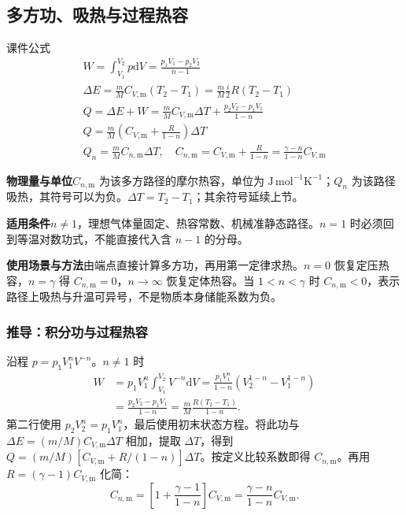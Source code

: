 \documentclass[UTF8,fontset=none,zihao=-4,a4paper]{ctexart}
\newcommand{\explain}[3]{\par\noindent\textbf{物理量与单位}\quad #1\par
\noindent\textbf{适用条件}\quad #2\par
\noindent\textbf{使用场景与方法}\quad #3\par}
\begin{document}
\par\noindent\begin{minipage}{\linewidth}
\subsection{多方功、吸热与过程热容}
\begin{infobox}[breakable=false]{课件公式}
\begin{gather*}W=\int_{V_1}^{V_2}p\mathrm dV=\frac{p_1V_1-p_2V_2}{n-1}\\\Delta E=\frac mM C_{V,\mathrm m}(T_2-T_1)=\frac mM\frac i2R(T_2-T_1)\\Q=\Delta E+W=\frac mM C_{V,\mathrm m}\Delta T+\frac{p_2V_2-p_1V_1}{1-n}\\Q=\frac mM\left(C_{V,\mathrm m}+\frac R{1-n}\right)\Delta T\\Q_n=\frac mM C_{n,\mathrm m}\Delta T,\quad C_{n,\mathrm m}=C_{V,\mathrm m}+\frac R{1-n}=\frac{\gamma-n}{1-n}C_{V,\mathrm m}\end{gather*}
\end{infobox}
\end{minipage}\par
\explain{$C_{n,\mathrm m}$ 为该多方路径的摩尔热容，单位为 $\mathrm{J\,mol^{-1}K^{-1}}$；$Q_n$ 为该路径吸热，其符号可以为负。$\Delta T=T_2-T_1$；其余符号延续上节。}{$n\ne1$，理想气体量固定、热容常数、机械准静态路径。$n=1$ 时必须回到等温对数功式，不能直接代入含 $n-1$ 的分母。}{由端点直接计算多方功，再用第一定律求热。$n=0$ 恢复定压热容，$n=\gamma$ 得 $C_{n,\mathrm m}=0$，$n\to\infty$ 恢复定体热容。当 $1<n<\gamma$ 时 $C_{n,\mathrm m}<0$，表示路径上吸热与升温可异号，不是物质本身储能系数为负。}


\subsubsection{推导：积分功与过程热容}
沿程 $p=p_1V_1^nV^{-n}$。$n\ne1$ 时
\begin{align*}
W&=p_1V_1^n\int_{V_1}^{V_2}V^{-n}\mathrm dV
=\frac{p_1V_1^n}{1-n}(V_2^{1-n}-V_1^{1-n})\\
&=\frac{p_2V_2-p_1V_1}{1-n}
=\frac{m}{M}\frac{R(T_2-T_1)}{1-n}.
\end{align*}
第二行使用 $p_2V_2^n=p_1V_1^n$，最后使用初末状态方程。将此功与 $\Delta E=(m/M)C_{V,\mathrm m}\Delta T$ 相加，提取 $\Delta T$，得到 $Q=(m/M)[C_{V,\mathrm m}+R/(1-n)]\Delta T$。按定义比较系数即得 $C_{n,\mathrm m}$。再用 $R=(\gamma-1)C_{V,\mathrm m}$ 化简：
\[
C_{n,\mathrm m}=\left[1+\frac{\gamma-1}{1-n}\right]C_{V,\mathrm m}=\frac{\gamma-n}{1-n}C_{V,\mathrm m}.
\]
\end{document}
